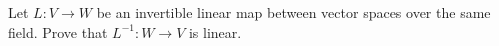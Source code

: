 \begin{exercise}
  \label{ex:lec03:inverse-is-linear}
  Let \(L:V\to W\) be an invertible linear map between vector spaces
  over the same field. Prove that \(L^{-1}:W\to V\) is linear.
\end{exercise}
